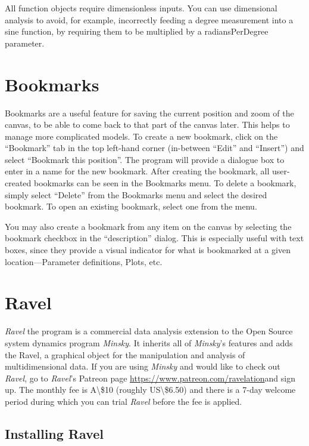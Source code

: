 All function objects require dimensionless inputs. You can use dimensional
analysis to avoid, for example, incorrectly feeding a degree measurement
into a sine function, by requiring them to be multiplied by a radiansPerDegree
parameter.

\section{Bookmarks}

Bookmarks are a useful feature for saving the current position and
zoom of the canvas, to be able to come back to that part of the canvas
later. This helps to manage more complicated models. To create a new
bookmark, click on the ``Bookmark'' tab in the top left-hand corner
(in-between ``Edit'' and ``Insert'') and select ``Bookmark this
position''. The program will provide a dialogue box to enter in a
name for the new bookmark. After creating the bookmark, all user-created
bookmarks can be seen in the Bookmarks menu. To delete a bookmark,
simply select ``Delete'' from the Bookmarks menu and select the
desired bookmark. To open an existing bookmark, select one from the
menu.

You may also create a bookmark from any item on the canvas by selecting
the bookmark checkbox in the ``description'' dialog. This is especially
useful with text boxes, since they provide a visual indicator for
what is bookmarked at a given location---Parameter definitions, Plots,
etc.

\section{Ravel}

\label{Ravel}\emph{Ravel} the program is a commercial data analysis
extension to the Open Source system dynamics program \emph{Minsky}.
It inherits all of \emph{Minsky}'s features and adds the Ravel\texttrademark \textcircledP ,
a graphical object for the manipulation and analysis of multidimensional
data. If you are using \emph{Minsky} and would like to check out \emph{Ravel},
go to \emph{Ravel}'s Patreon page \url{https://www.patreon.com/ravelation}and
sign up. The monthly fee is A\textbackslash\$10 (roughly US\textbackslash\$6.50)
and there is a 7-day welcome period during which you can trial \emph{Ravel}
before the fee is applied.

\subsection{Installing Ravel}

